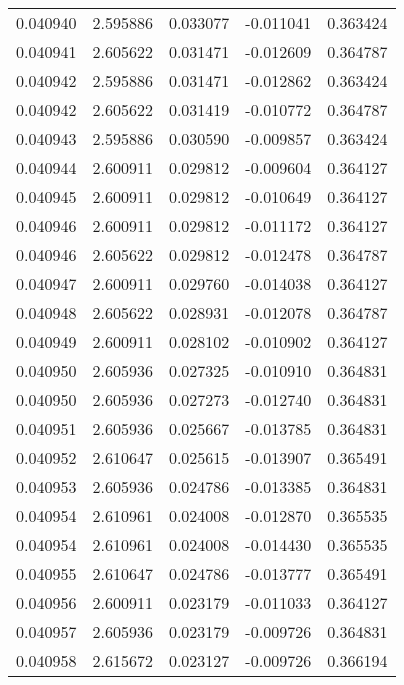 \begin{tabular}{lrrrr}
0.040940    &  2.595886 &  0.033077 & -0.011041 &             0.363424 \\
0.040941    &  2.605622 &  0.031471 & -0.012609 &             0.364787 \\
0.040942    &  2.595886 &  0.031471 & -0.012862 &             0.363424 \\
0.040942    &  2.605622 &  0.031419 & -0.010772 &             0.364787 \\
0.040943    &  2.595886 &  0.030590 & -0.009857 &             0.363424 \\
0.040944    &  2.600911 &  0.029812 & -0.009604 &             0.364127 \\
0.040945    &  2.600911 &  0.029812 & -0.010649 &             0.364127 \\
0.040946    &  2.600911 &  0.029812 & -0.011172 &             0.364127 \\
0.040946    &  2.605622 &  0.029812 & -0.012478 &             0.364787 \\
0.040947    &  2.600911 &  0.029760 & -0.014038 &             0.364127 \\
0.040948    &  2.605622 &  0.028931 & -0.012078 &             0.364787 \\
0.040949    &  2.600911 &  0.028102 & -0.010902 &             0.364127 \\
0.040950    &  2.605936 &  0.027325 & -0.010910 &             0.364831 \\
0.040950    &  2.605936 &  0.027273 & -0.012740 &             0.364831 \\
0.040951    &  2.605936 &  0.025667 & -0.013785 &             0.364831 \\
0.040952    &  2.610647 &  0.025615 & -0.013907 &             0.365491 \\
0.040953    &  2.605936 &  0.024786 & -0.013385 &             0.364831 \\
0.040954    &  2.610961 &  0.024008 & -0.012870 &             0.365535 \\
0.040954    &  2.610961 &  0.024008 & -0.014430 &             0.365535 \\
0.040955    &  2.610647 &  0.024786 & -0.013777 &             0.365491 \\
0.040956    &  2.600911 &  0.023179 & -0.011033 &             0.364127 \\
0.040957    &  2.605936 &  0.023179 & -0.009726 &             0.364831 \\
0.040958    &  2.615672 &  0.023127 & -0.009726 &             0.366194 \\

\end{tabular}

